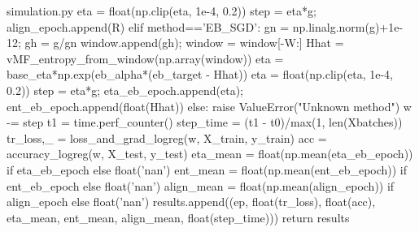\begin{filecontents*}{simulation.py}
                eta = float(np.clip(eta, 1e-4, 0.2))
                step = eta*g; align_epoch.append(R)
            elif method=='EB_SGD':
                gn = np.linalg.norm(g)+1e-12; gh = g/gn
                window.append(gh); window = window[-W:]
                Hhat = vMF_entropy_from_window(np.array(window))
                eta = base_eta*np.exp(eb_alpha*(eb_target - Hhat))
                eta = float(np.clip(eta, 1e-4, 0.2))
                step = eta*g; eta_eb_epoch.append(eta); ent_eb_epoch.append(float(Hhat))
            else:
                raise ValueError("Unknown method")
            w -= step
        t1 = time.perf_counter()
        step_time = (t1 - t0)/max(1, len(Xbatches))
        tr_loss,_ = loss_and_grad_logreg(w, X_train, y_train)
        acc = accuracy_logreg(w, X_test, y_test)
        eta_mean = float(np.mean(eta_eb_epoch)) if eta_eb_epoch else float('nan')
        ent_mean = float(np.mean(ent_eb_epoch)) if ent_eb_epoch else float('nan')
        align_mean = float(np.mean(align_epoch)) if align_epoch else float('nan')
        results.append((ep, float(tr_loss), float(acc), eta_mean, ent_mean, align_mean, float(step_time)))
    return results


\end{filecontents*}
